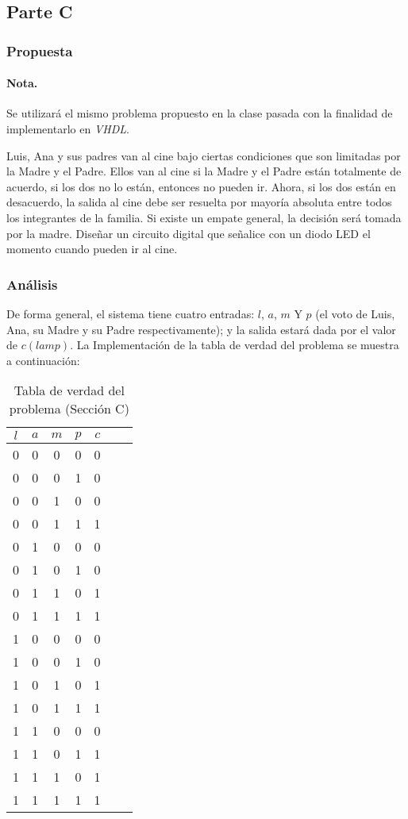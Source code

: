 \documentclass[../procedimientos.tex]{subfiles}
\begin{document}
\clearpage
\subsection{Parte C}
\subsubsection{Propuesta}
\paragraph{Nota.} Se utilizará el mismo problema propuesto en la clase pasada 
con la finalidad de implementarlo en \textit{VHDL}.

\begin{em}
  Luis, Ana y sus padres van al cine bajo ciertas condiciones que son limitadas 
  por la Madre y el Padre.  Ellos van al cine si la Madre y el Padre están 
  totalmente de acuerdo, si los dos no lo están, entonces no pueden ir.  Ahora, 
  si los dos están en desacuerdo, la salida al cine debe ser resuelta por 
  mayoría absoluta entre todos los integrantes de la familia.  Si existe un 
  empate general, la decisión será tomada por la madre.  Diseñar un circuito 
  digital que señalice con un diodo LED el momento cuando pueden ir al cine.
\end{em}

\subsubsection{Análisis}
De forma general, el sistema tiene cuatro entradas: $l$, $a$, $m$ Y $p$ (el 
voto de Luis, Ana, su Madre y su Padre respectivamente); y la salida estará 
dada por el valor de $c(lamp)$.  La Implementación de la tabla de verdad del 
problema se muestra a continuación:
\begin{table}[H]
  \centering
  \begin{tabular}{cccc|ccc}
    \hline
    $l$ & $a$ & $m$ & $p$ & $c$\\
    \hline
    0 & 0 & 0 & 0 & 0\\
    0 & 0 & 0 & 1 & 0\\
    0 & 0 & 1 & 0 & 0\\
    0 & 0 & 1 & 1 & 1\\
    0 & 1 & 0 & 0 & 0\\
    0 & 1 & 0 & 1 & 0\\
    0 & 1 & 1 & 0 & 1\\
    0 & 1 & 1 & 1 & 1\\
    1 & 0 & 0 & 0 & 0\\
    1 & 0 & 0 & 1 & 0\\
    1 & 0 & 1 & 0 & 1\\
    1 & 0 & 1 & 1 & 1\\
    1 & 1 & 0 & 0 & 0\\
    1 & 1 & 0 & 1 & 1\\
    1 & 1 & 1 & 0 & 1\\
    1 & 1 & 1 & 1 & 1\\
    \hline
  \end{tabular}
  \caption{Tabla de verdad del problema (Sección C)}
  \label{tab:tv_c}
\end{table}
\end{document}
